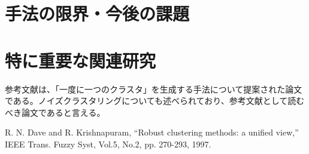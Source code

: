 \documentclass[10pt,onecolumn]{jsarticle}
\begin{document}
\section{手法の限界・今後の課題}

\section{特に重要な関連研究}
参考文献\cite{ref1}は、「一度に一つのクラスタ」を生成する手法について提案された論文である。ノイズクラスタリングについても述べられており、参考文献として読むべき論文であると言える。


\begin{thebibliography}{99}
%
	R. N. Dave and R. Krishnapuram, “Robust clustering methods: a unified view,” IEEE Trans. Fuzzy Syst, Vol.5, No.2, pp. 270-293, 1997.
%
\end{thebibliography}



\end{document}
